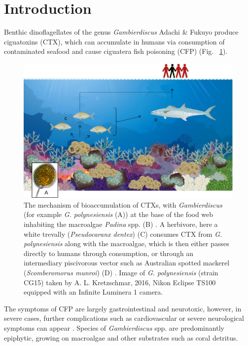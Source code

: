 \documentclass[12pt]{article}
\begin{document}
\section*{Introduction}
\FloatBarrier
Benthic dinoflagellates of the genus \emph{Gambierdiscus} Adachi \& Fukuyo produce ciguatoxins (CTX), which can accumulate in humans via consumption of contaminated seafood and cause ciguatera fish poisoning (CFP) (Fig. ~\ref{fig:bioaccom}). 
\begin{figure} 
\includegraphics[scale=.55]{Hero_qpcr-figs/CFP-diagram.png} 
\caption{The mechanism of bioaccumulation of CTXs, with \textit{Gambierdiscus} (for example \emph{G. polynesiensis} (A)) at the base of the food web inhabiting the macroalgae \emph{Padina} spp. (B) \cite{padina}. 
A herbivore, here a white trevally (\emph{Pseudocaranx dentex}) (C) \cite{trevally} consumes CTX from \emph{G. polynesiensis} along with the macroalgae, which is then either passes directly to humans through consumption, or through an intermediary piscivorous vector such as Australian spotted mackerel (\emph{Scomberomorus munroi}) (D) \cite{mackerel}. 
Image of \emph{G. polynesiensis} (strain CG15) taken by A. L. Kretzschmar, 2016, Nikon Eclipse TS100 equipped with an Infinite Luminera 1 camera.} 
\label{fig:bioaccom}
\end{figure} 
The symptoms of CFP are largely gastrointestinal and neurotoxic, however, in severe cases, further complications such as cardiovascular or severe neurological symptoms can appear \citep{sims1987theoretical}. 
Species of \emph{Gambierdiscus} spp. are predominantly epiphytic, growing on macroalgae and other substrates such as coral detritus. 
\end{document}
